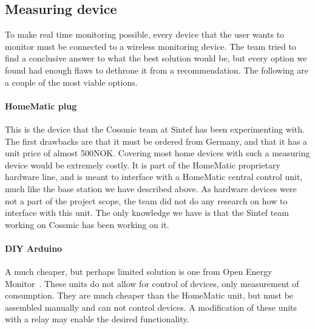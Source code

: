 \subsection{Measuring device}
To make real time monitoring possible, every device that the user wants to monitor must be connected to a wireless monitoring device. The team tried to find a conclusive answer to what the best solution would be, but every option we found had enough flaws to dethrone it from a recommendation. The following are a couple of the most viable options.

\paragraph{HomeMatic plug}
This is the device that the Cossmic team at Sintef has been experimenting with. The first drawbacks are that it must be ordered from Germany, and that it has a unit price of almost 500NOK. Covering most home devices with such a measuring device would be extremely costly. It is part of the HomeMatic proprietary hardware line, and is meant to interface with a HomeMatic central control unit, much like the base station we have described above. As hardware devices were not a part of the project scope, the team did not do any research on how to interface with this unit. The only knowledge we have is that the Sintef team working on Cossmic has been working on it.

\paragraph{DIY Arduino}
A much cheaper, but perhaps limited solution is one from Open Energy Monitor~\cite{oemmodule}. These units do not allow for control of devices, only measurement of consumption. They are much cheaper than the HomeMatic unit, but must be assembled manually and can not control devices. A modification of these units with a relay may enable the desired functionality.